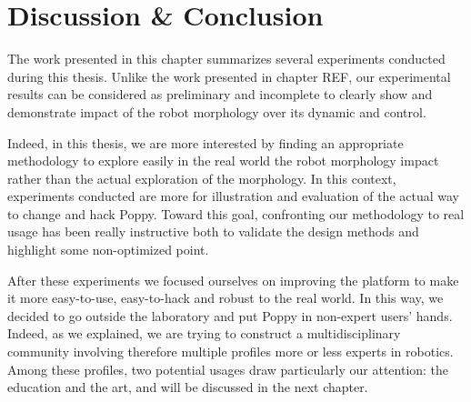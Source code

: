 





\section{Discussion \& Conclusion } %

The work presented in this chapter summarizes several experiments conducted during this thesis.
Unlike the work presented in chapter REF, our experimental results can be considered as preliminary and incomplete to clearly show and demonstrate impact of the robot morphology over its dynamic and control.

Indeed, in this thesis, we are more interested by finding an appropriate methodology to explore easily in the real world the robot morphology impact rather than the actual exploration of the morphology. In this context, experiments conducted are more for illustration and evaluation of the actual way to change and hack Poppy. Toward this goal, confronting our methodology to real usage has been really instructive both to validate the design methods and highlight some non-optimized point.

After these experiments we focused ourselves on improving the platform to make it more easy-to-use, easy-to-hack and robust to the real world. In this way, we decided to go outside the laboratory and put Poppy in non-expert users' hands. Indeed, as we explained, we are trying to construct a multidisciplinary community involving therefore multiple profiles more or less experts in robotics. Among these profiles, two potential usages draw particularly our attention: the education and the art, and will be discussed in the next chapter.


